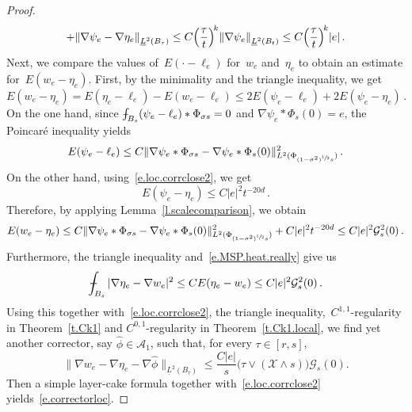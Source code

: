 \documentclass[11pt]{article} %
\numberwithin{equation}{section}
\theoremstyle{definition}
\let\originalleft\left
\let\originalright\right
\renewcommand{\left}{\mathopen{}\mathclose\bgroup\originalleft}
\renewcommand{\right}{\aftergroup\egroup\originalright}
\renewcommand*{\hat}{\widehat}
\newcommand{\X}{\mathcal{X}}
\def\Xint#1{\mathchoice
{\XXint\displaystyle\textstyle{#1}}%
{\XXint\textstyle\scriptstyle{#1}}%
{\XXint\scriptstyle\scriptscriptstyle{#1}}%
{\XXint\scriptscriptstyle\scriptscriptstyle{#1}}%
\!\int}
\def\XXint#1#2#3{{\setbox0=\hbox{$#1{#2#3}{\int}$}
\vcenter{\hbox{$#2#3$}}\kern-.5\wd0}}
\def\fint{\Xint-}
\newcommand{\A}{\mathcal{A}}
\begin{document}
\begin{proof}
\begin{align}
+
\left\|  \nabla  \psi_e -  \nabla  \eta_e \right\|_{\underline{L}^2 \left( B_{\tau} \right)} 
\leq 
C  \left( \frac{\tau}{t}\right)^{\!k}  \left\| \nabla \psi_e \right\|_{\underline{L}^2 \left( B_{t} \right)}  
\leq 
C\left( \frac{\tau}{t}\right)^{\!k} |e|
\,.
\end{align}
Next, we compare the values of~$E(\cdot - \ell_e)$ for~$w_e$ and~$\eta_e$ to obtain an estimate for~$E(w_e-\eta_e)$.  First, by the minimality and the triangle inequality, we get
\begin{equation*}  
E(w_e-\eta_e) 
= 
E(\eta_e-\ell_e) - E(w_e-\ell_e) 
\leq 
2 E(\psi_e-\ell_e) +  2 E(\psi_e-\eta_e) 
\,.
\end{equation*}
On the one hand, since $\fint_{B_s} (\psi_e - \ell_e) \ast \Phi_{\sigma s} = 0$ and $\nabla \psi_e \ast  \Phi_s (0)  = e$, the Poincar\'e inequality yields
\begin{equation*}  
 E (\psi_e - \ell_e) 
 \leq 
 C \| \nabla \psi_e \ast \Phi_{\sigma s} - \nabla \psi_e \ast \Phi_{s}(0) \|_{L^2(\Phi_{(1-\sigma^2)^{\sfrac 12} s })}^2 
 \,.
\end{equation*}
On the other hand, using~\eqref{e.loc.corrclose2}, we get
\begin{equation*}  
E(\psi_e-\eta_e)  \leq C |e|^2 t^{-20d} \,.
\end{equation*}
Therefore, by applying Lemma~\ref{l.scalecomparison}, we obtain 
\begin{equation*}  
E(w_e-\eta_e) 
\leq 
C\| \nabla \psi_e \ast \Phi_{\sigma s} - \nabla \psi_e \ast \Phi_{s}(0) \|_{L^2(\Phi_{(1-\sigma^2)^{\sfrac 12} s })}^2 
 + C|e|^2 t^{-20d}  
 \leq 
 C|e|^2  \mathcal{G}_{s}^2(0)
\,.
\end{equation*}
Furthermore, the triangle inequality and~\eqref{e.MSP.heat.really} give us
\begin{equation*}  
\fint_{B_{s} } |\nabla \eta_e - \nabla w_e|^2 
\leq 
C E(\eta_e - w_e) 
\leq 
C |e|^2 \mathcal{G}_{s}^2(0)
\,.
\end{equation*}
Using this together with~\eqref{e.loc.corrclose2}, the triangle inequality,~$C^{1,1}$-regularity in Theorem~\ref{t.Ck1} and $C^{0,1}$-regularity in Theorem~\ref{t.Ck1.local}, we find yet another corrector, say $\hat\phi \in \A_1$, such that, for every $\tau \in [r,s]$, 
\begin{equation*}  
\| \nabla w_e - \nabla \eta_e - \nabla \hat\phi \|_{\underline{L}^2(B_\tau)}  \leq \frac{C |e|}{s} \bigl( \tau \vee (\X \wedge s) \bigr) \mathcal{G}_{s}(0) .
\end{equation*}
Then a simple layer-cake formula together with~\eqref{e.loc.corrclose2} yields~\eqref{e.correctorloc}. 


\end{proof}
\end{document}
